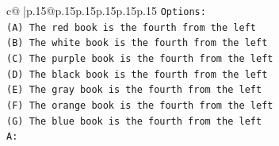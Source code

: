 \documentclass{article}
\begin{document}
{\begin{supertabular}{c@{$\;$}|p{.15\linewidth}@{}p{.15\linewidth}p{.15\linewidth}p{.15\linewidth}p{.15\linewidth}p{.15\linewidth}}
{{{\texttt{Options:} \\
\texttt{(A) The red book is the fourth from the left} \\
\texttt{(B) The white book is the fourth from the left} \\
\texttt{(C) The purple book is the fourth from the left} \\
\texttt{(D) The black book is the fourth from the left} \\
\texttt{(E) The gray book is the fourth from the left} \\
\texttt{(F) The orange book is the fourth from the left} \\
\texttt{(G) The blue book is the fourth from the left} \\
\texttt{A:} \\
            }
        }
    }
     \\ \\


\end{supertabular}}
\end{document}
